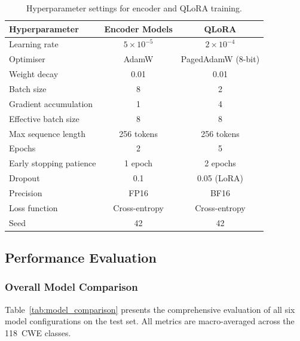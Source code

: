 \documentclass[conference]{IEEEtran}
\begin{document}
\begin{table}[t]
\centering
\caption{Hyperparameter settings for encoder and QLoRA training.}
\label{tab:hyperparams}
\begin{tabular}{lcc}
\hline
\textbf{Hyperparameter} & \textbf{Encoder Models} & \textbf{QLoRA} \\
\hline
Learning rate            & $5 \times 10^{-5}$      & $2 \times 10^{-4}$ \\
Optimiser                & AdamW                   & PagedAdamW (8-bit) \\
Weight decay             & 0.01                    & 0.01 \\
Batch size               & 8                       & 2 \\
Gradient accumulation    & 1                       & 4 \\
Effective batch size     & 8                       & 8 \\
Max sequence length      & 256 tokens              & 256 tokens \\
Epochs                   & 2                       & 5 \\
Early stopping patience  & 1 epoch                 & 2 epochs \\
Dropout                  & 0.1                     & 0.05 (LoRA) \\
Precision                & FP16                    & BF16 \\
Loss function            & Cross-entropy           & Cross-entropy \\
Seed                     & 42                      & 42 \\
\hline
\end{tabular}
\end{table}

\subsection{Performance Evaluation}
\label{sec:performance}

\subsubsection{Overall Model Comparison}
Table~\ref{tab:model_comparison} presents the comprehensive evaluation of
all six model configurations on the test set.  All metrics are
macro-averaged across the 118~CWE classes.
\end{document}
